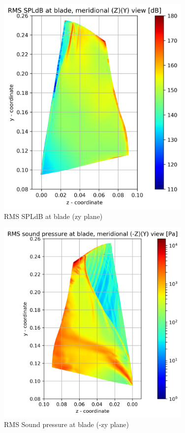 \begin{figure}[ht]
	\centering
	\includegraphics[width=0.85\textwidth]{Figures/blade-zy-rms-spldb.png}
	\caption{RMS SPLdB at blade (zy plane)} \label{blade-zy-rms-spldb}
\end{figure}

\begin{figure}[ht]
	\centering
	\includegraphics[width=0.85\textwidth]{Figures/blade-negzy-rms-spl.png}
    \caption{RMS Sound pressure at blade (-zy plane)} \label{blade-negzy-rms-spl}
\end{figure}	

